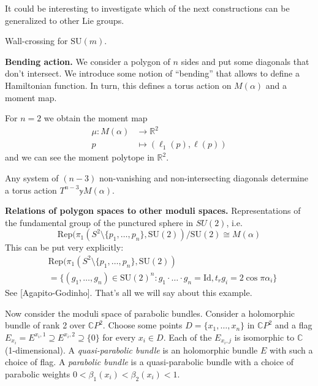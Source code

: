 {It could be interesting to investigate
which of the next constructions can be generalized
to other Lie groups.

\begin{theorem}
\label{theorem-Sotillo}
Wall-crossing for $\text{SU}(m)$.
\end{theorem}

\medskip\noindent
{\bf Bending action.}
We consider a polygon of $n$ sides
and put some diagonals that don't intersect.
We introduce some
notion of ``bending'' that allows
to define a Hamiltonian function.
In turn, this defines a torus action on $M(\alpha)$
and a moment map. 

For $n=2$ we obtain the moment map
\begin{align*}
\mu: M(\alpha) &\longrightarrow \mathbb{R}^2 \\
p &\longmapsto (\ell_1(p),\ell(p))
\end{align*}
and we can see the moment polytope in $\mathbb{R}^2$.

\begin{remark}
\label{remark-nonvanishing-and-nonintersecting-diagonals}
Any system of $(n-3)$ non-vanishing
and non-intersecting diagonals determine
a torus action $T^{n-3}\mathbb{y} M(\alpha)$.
\end{remark}

\medskip\noindent
{\bf Relations of polygon spaces to other moduli spaces.}
Representations of the fundamental group
of the punctured sphere in $SU(2)$, i.e.
$$
\text{Rep}(\pi_1(S^2\setminus \{p_1,\ldots,p_n\},\text{SU}(2))/\text{SU}(2) 
\cong
M(\alpha)
$$ 
This can be put very explicitly:
\begin{align*}
&\text{Rep}(\pi_1(S^2\setminus \{p_1,\ldots,p_n\},\text{SU}(2))\\
&=\{(g_1,\ldots,g_n)\in \text{SU}(2)^n:g_1\cdot\ldots\cdot g_n=\text{Id},
t_rg_i=2\cos\pi \alpha_i\}
\end{align*}
See [Agapito-Godinho]. That's all we
will say about this example.

\medskip\noindent
Now consider the moduli space of parabolic bundles.
Consider a holomorphic bundle of rank 2 over $\mathbb{C}P^{2}$.
Choose some points $D=\{x_1,\ldots,x_n\}$ in $\mathbb{C}P^{2}$ 
and a flag
$E_{x_i}=E^{x_i,1}\supseteq E^{x_i,2}\supseteq \{0\}$ 
for every $x_i \in D$. Each of the
$E_{x_i,j}$ is isomorphic to $\mathbb{C}$
(1-dimensional).
A {\it quasi-parabolic bundle} 
is an holomorphic bundle $E$
with such a choice of flag.
A {\it parabolic bundle} is a quasi-parabolic
bundle with a choice of parabolic weights
$0< \beta_1(x_i)< \beta_2(x_i)<1$.

}
